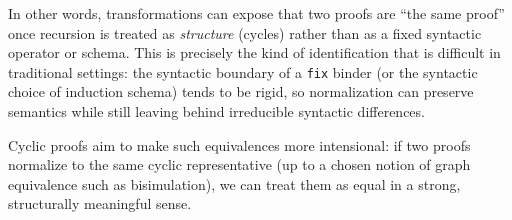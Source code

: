 In other words, transformations can expose that two proofs are ``the same proof'' once recursion is treated as \emph{structure} (cycles) rather than as a fixed syntactic operator or schema.
This is precisely the kind of identification that is difficult in traditional settings: the syntactic boundary of a \texttt{fix} binder (or the syntactic choice of induction schema) tends to be rigid, so normalization can preserve semantics while still leaving behind irreducible syntactic differences.

Cyclic proofs aim to make such equivalences more intensional:
if two proofs normalize to the same cyclic representative (up to a chosen notion of graph equivalence such as bisimulation), we can treat them as equal in a strong, structurally meaningful sense.
